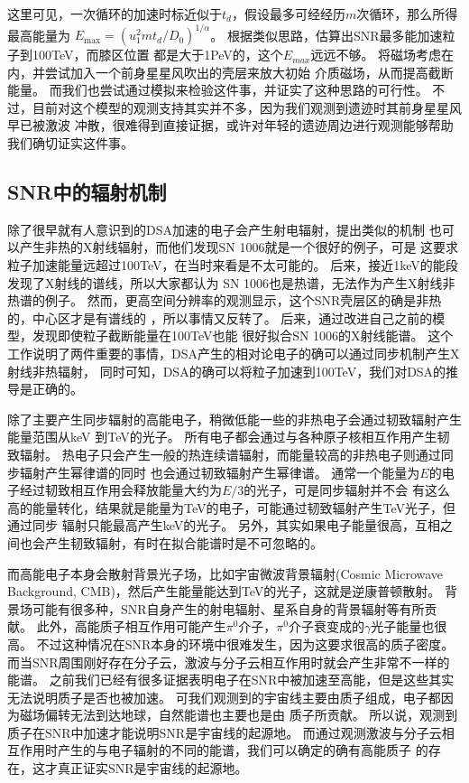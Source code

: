 这里可见，一次循环的加速时标近似于$t_{d}$，假设最多可经经历$m$次循环，那么所得最高能量为
$E_{\max }=(u_{1}^{2} m t_{d}/D_{0})^{1/\alpha}$。
根据类似思路，\citet{1983A&A...125..249L}估算出SNR最多能加速粒子到100TeV，而膝区位置
都是大于1PeV的，这个$E_{max}$远远不够。
\citet{Zirakashvili2018}将磁场考虑在内，并尝试加入一个前身星星风吹出的壳层来放大初始
介质磁场，从而提高截断能量。
而我们也尝试通过模拟来检验这件事，并证实了这种思路的可行性\citep{Zhang2018}。
不过，目前对这个模型的观测支持其实并不多，因为我们观测到遗迹时其前身星星风早已被激波
冲散，很难得到直接证据，或许对年轻的遗迹周边进行观测能够帮助我们确切证实这件事。

\subsection{SNR中的辐射机制}
除了很早就有人意识到的DSA加速的电子会产生射电辐射，\citet{Reynolds1981}提出类似的机制
也可以产生非热的X射线辐射，而他们发现SN 1006就是一个很好的例子\citep{Becker1980}，可是
这要求粒子加速能量远超过100TeV，在当时来看是不太可能的。
后来，\citet{1982ApL....22..103G}接近1keV的能段发现了X射线的谱线，所以大家都认为
SN 1006也是热谱，无法作为产生X射线非热谱的例子。
然而，更高空间分辨率的观测显示，这个SNR壳层区的确是非热的，中心区才是有谱线的
\citep{Koyama1995}，所以事情又反转了。
后来，\citep{Reynolds1998}通过改进自己之前的模型，发现即使粒子截断能量在100TeV也能
很好拟合SN 1006的X射线能谱。
这个工作说明了两件重要的事情，DSA产生的相对论电子的确可以通过同步机制产生X射线非热辐射，
同时可知，DSA的确可以将粒子加速到100TeV，我们对DSA的推导是正确的。

除了主要产生同步辐射的高能电子，稍微低能一些的非热电子会通过韧致辐射产生能量范围从keV
到TeV的光子。
所有电子都会通过与各种原子核相互作用产生韧致辐射。
热电子只会产生一般的热连续谱辐射，而能量较高的非热电子则通过同步辐射产生幂律谱的同时
也会通过韧致辐射产生幂律谱。
通常一个能量为$E$的电子经过韧致相互作用会释放能量大约为$E/3$的光子，可是同步辐射并不会
有这么高的能量转化，结果就是能量为TeV的电子，可能通过韧致辐射产生TeV光子，但通过同步
辐射只能最高产生keV的光子。
另外，其实如果电子能量很高，互相之间也会产生韧致辐射，有时在拟合能谱时是不可忽略的。

而高能电子本身会散射背景光子场，比如宇宙微波背景辐射(Cosmic Microwave Background,
CMB)，然后产生能量能达到TeV的光子，这就是逆康普顿散射。
背景场可能有很多种，SNR自身产生的射电辐射、星系自身的背景辐射等有所贡献。
此外，高能质子相互作用可能产生$\pi^0$介子，$\pi^0$介子衰变成的$\gamma$光子能量也很高。
不过这种情况在SNR本身的环境中很难发生，因为这要求很高的质子密度。
而当SNR周围刚好存在分子云，激波与分子云相互作用时就会产生非常不一样的能谱。
之前我们已经有很多证据表明电子在SNR中被加速至高能，但是这些其实无法说明质子是否也被加速。
可我们观测到的宇宙线主要由质子组成，电子都因为磁场偏转无法到达地球，自然能谱也主要也是由
质子所贡献。
所以说，观测到质子在SNR中加速才能说明SNR是宇宙线的起源地。
而通过观测激波与分子云相互作用时产生的与电子辐射的不同的能谱，我们可以确定的确有高能质子
的存在，这才真正证实SNR是宇宙线的起源地。

